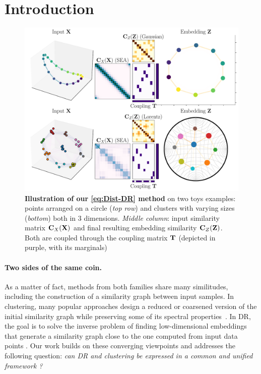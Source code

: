 

\section{Introduction}

\begin{figure}[!ht]
	\begin{center}
	\centerline{\includegraphics[width=\columnwidth]{figures/DistR/fig_general.pdf}}
	\caption{\textbf{Illustration of our \ref{eq:Dist-DR} method} on two toys examples: points arranged on a circle ({\em top row}) and clusters with varying sizes ({\em bottom}) both in 3 dimensions. {\em Middle column}: input similarity matrix ${\mathbf{C}}_X({\mathbf{X}})$ and final resulting embedding similarity ${\mathbf{C}}_Z({\mathbf{Z}})$. Both are coupled through the coupling matrix ${\mathbf{T}}$ (depicted in purple, with its marginals)}
	\label{fig:general_idea}
	\end{center}
	\vskip -0.3in
\end{figure}

\paragraph{Two sides of the same coin.} As a matter of fact, methods from both families share many similitudes, %
including the construction of a similarity graph between input samples. In clustering, many popular approaches design a reduced or coarsened version of the initial similarity graph while preserving some of its spectral properties~\cite{von2007tutorial, schaeffer2007graph}. 
In DR, the goal is to solve the inverse problem of finding low-dimensional embeddings that generate a similarity graph close to the %
one computed from input data points \cite{ham2004kernel,hinton2002stochastic}.
Our work builds on these converging viewpoints and addresses the following question: \emph{can DR and clustering  be expressed in a common and unified framework ?}

